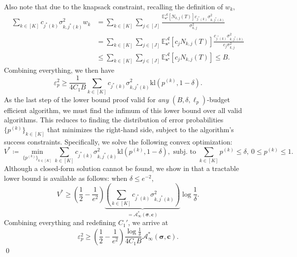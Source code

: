 \documentclass{article}
\def\vc{{\bm{c}}}
\def\vs{{\bm{s}}}
\def\gA{{\mathcal{A}}}
\newcommand{\E}{\mathbb{E}}
\newcommand{\kl}{\mathrm{kl}}
\theoremstyle{plain}
\theoremstyle{definition}
\theoremstyle{plain}
\begin{document}
Also note that due to the knapsack constraint, recalling the definition of $w_k$,
\begin{align}
    \sum_{k \in [K]} c_{j^*(k)} \sigma_{k,j^*(k)}^2 w_k &= \sum_{k \in [K]} \sum_{j \in [J]} \frac{\E^\gA_{\vs^\star}[N_{k,j}(T)] c_{j^*(k)} \sigma_{k,j^*(k)}^2}{\sigma_{k,j}^2} \\
    &= \sum_{k \in [K]} \sum_{j \in [J]} \E^\gA_{\vs^\star}[c_j N_{k,j}(T)] \frac{c_{j^*(k)} \sigma_{k,j^*(k)}^2}{c_j \sigma_{k,j}^2} \\
    &\leq \sum_{k \in [K]} \sum_{j \in [J]} \E^\gA_{\vs^\star}[c_j N_{k,j}(T)]
    \leq B.
\end{align}
Combining everything, we then have
\begin{equation}
    \varepsilon_p^2 \geq \frac{1}{4 C_1 B} \sum_{k \in [K]} c_{j^*(k)} \sigma_{k,j^*(k)}^2 \kl(p^{(k)}, 1 - \delta).
\end{equation}
As the last step of the lower bound proof valid for \emph{any} $(B, \delta, \ell_p)$-budget efficient algorithm, we must find the infimum of this lower bound over all valid algorithms.
This reduces to finding the distribution of error probabilities $\{p^{(k)}\}_{k \in [K]}$ that minimizes the right-hand side, subject to the algorithm's success constraints.
Specifically, we solve the following convex optimization:
\begin{equation}
\label{eqn:infimum-p}
    V^* \coloneq \min_{\{p^{(k)}\}_{k \in [K]}} \sum_{k \in [K]} c_{j^*(k)} \sigma_{k,j^*(k)}^2 \kl(p^{(k)}, 1 - \delta), \text{ subj. to } \sum_{k \in [K]} p^{(k)} \leq \delta, \ 0 \leq p^{(k)} \leq 1.
\end{equation}
Although a closed-form solution cannot be found, we show in  that a tractable lower bound is available as follows: when $\delta \leq e^{-2}$,
\begin{equation}
    V^* \geq \left( \frac{1}{2} - \frac{1}{e^2} \right) \underbrace{\left( \sum_{k \in [K]} c_{j^*(k)} \sigma_{k,j^*(k)}^2 \right)}_{= \gA_\infty^*(\bm\sigma, \vc)} \log\frac{1}{\delta}.
\end{equation}
Combining everything and redefining $C_1'$, we arrive at
\begin{equation}
    \varepsilon_p^2 \geq \left( \frac{1}{2} - \frac{1}{e^2} \right) \frac{\log\frac{1}{\delta}}{4 C_1 B} \gA_\infty^*(\bm\sigma, \vc).
\end{equation}
\qed
\end{document}
